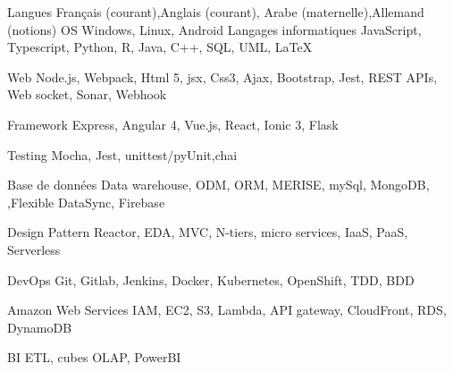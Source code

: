 

\begin{cvskills}
  \cvskill
    {Langues } %
    {Français  (courant),Anglais (courant), Arabe (maternelle),Allemand (notions)} %
  \cvskill
    {OS} %
    {Windows, Linux, Android} %
  \cvskill
    {Langages informatiques} %
    {JavaScript, Typescript, Python, R, Java, C++, SQL, UML, LaTeX} %

  \cvskill
    {Web} %
    {Node.js, Webpack, Html 5, jsx, Css3, Ajax, Bootstrap, Jest, REST APIs, Web socket, Sonar, Webhook} %

  \cvskill
    {Framework} %
    {Express, Angular 4, Vue.js, React, Ionic 3, Flask} %

\cvskill
    {Testing} %
    {Mocha, Jest, unittest/pyUnit,chai} %

  \cvskill
    {Base de données} %
    {Data warehouse, ODM, ORM, MERISE, mySql, MongoDB, ,Flexible DataSync, Firebase } %

  \cvskill
    {Design Pattern} %
    {Reactor, EDA, MVC, N-tiers, micro services, IaaS, PaaS, Serverless } %

  \cvskill
    {DevOps} %
    {Git, Gitlab, Jenkins, Docker, Kubernetes, OpenShift, TDD, BDD  } %

\cvskill
    {Amazon Web Services} %
    {IAM, EC2, S3, Lambda, API gateway, CloudFront, RDS, DynamoDB } %

\cvskill
    {BI} %
    {ETL, cubes OLAP, PowerBI } %


\end{cvskills}
